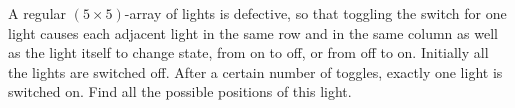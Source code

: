 A regular $ (5 \times 5)$-array of lights is defective, so that toggling the switch for one light causes each adjacent light in the same row and in the same column as well as the light itself to change state, from on to off, or from off to on. Initially all the lights are switched off. After a certain number of toggles, exactly one light is switched on. Find all the possible positions of this light.